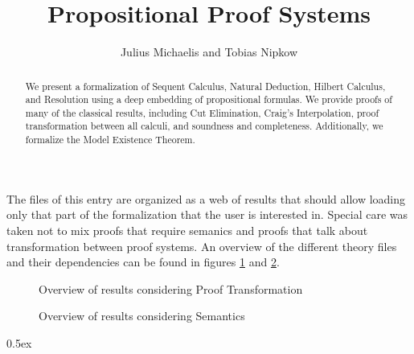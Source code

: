 \documentclass[11pt,a4paper]{article}
\begin{document}
\title{Propositional Proof Systems}
\author{Julius Michaelis and Tobias Nipkow}
\maketitle
\begin{abstract}
We present a formalization of Sequent Calculus, Natural Deduction, Hilbert Calculus, and Resolution using a deep embedding of propositional formulas. 
We provide proofs of many of the classical results, including Cut Elimination, Craig's Interpolation, proof transformation between all calculi, and soundness and completeness.
Additionally, we formalize the Model Existence Theorem.
\end{abstract}

\tableofcontents
\vspace{1em}

The files of this entry are organized as a web of results that should allow loading only that part of the formalization that the user is interested in.
Special care was taken not to mix proofs that require semanics and proofs that talk about transformation between proof systems.
An overview of the different theory files and their dependencies can be found in figures \ref{fig:prooftran} and \ref{fig:sema}.

\begin{figure}
	\centering
	
	\caption{Overview of results considering Proof Transformation}
	\label{fig:prooftran}
\end{figure}
\begin{figure}
	\centering
	\scalebox{0.8}{}
	\caption{Overview of results considering Semantics}
	\label{fig:sema}
\end{figure}

\parindent 0pt\parskip 0.5ex





\end{document}
